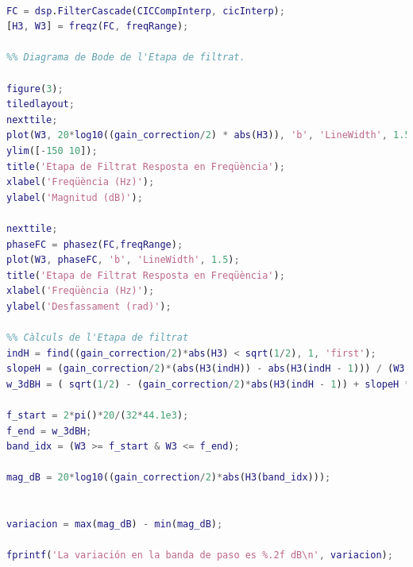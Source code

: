 \begin{lstlisting}[language=Matlab, basicstyle=\ttfamily\small, breaklines=true, frame=single]
%%  Etapa de Filtrat Final

FC = dsp.FilterCascade(CICCompInterp, cicInterp);
[H3, W3] = freqz(FC, freqRange);

%% Diagrama de Bode de l'Etapa de filtrat.

figure(3);
tiledlayout;
nexttile;
plot(W3, 20*log10((gain_correction/2) * abs(H3)), 'b', 'LineWidth', 1.5);
ylim([-150 10]);
title('Etapa de Filtrat Resposta en Freqüència');
xlabel('Freqüència (Hz)');
ylabel('Magnitud (dB)');

nexttile;
phaseFC = phasez(FC,freqRange);
plot(W3, phaseFC, 'b', 'LineWidth', 1.5);
title('Etapa de Filtrat Resposta en Freqüència');
xlabel('Freqüència (Hz)');
ylabel('Desfassament (rad)');

%% Càlculs de l'Etapa de filtrat
indH = find((gain_correction/2)*abs(H3) < sqrt(1/2), 1, 'first');
slopeH = (gain_correction/2)*(abs(H3(indH)) - abs(H3(indH - 1))) / (W3(indH) - W3(indH - 1));
w_3dBH = ( sqrt(1/2) - (gain_correction/2)*abs(H3(indH - 1)) + slopeH * W3(indH - 1) )/(slopeH);

f_start = 2*pi()*20/(32*44.1e3); 
f_end = w_3dBH; 
band_idx = (W3 >= f_start & W3 <= f_end); 

mag_dB = 20*log10((gain_correction/2)*abs(H3(band_idx)));


variacion = max(mag_dB) - min(mag_dB);

fprintf('La variación en la banda de paso es %.2f dB\n', variacion);

\end{lstlisting}

\newpage

